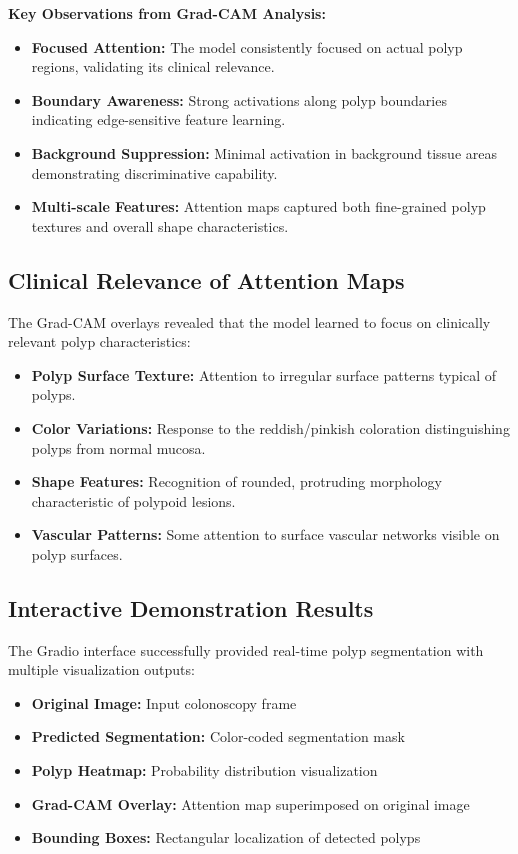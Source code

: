 \documentclass[a4paper,12pt]{report}
\begin{document}
\textbf{Key Observations from Grad-CAM Analysis:}
\begin{itemize}
\item \textbf{Focused Attention:} The model consistently focused on actual polyp regions, validating its clinical relevance.
\item \textbf{Boundary Awareness:} Strong activations along polyp boundaries indicating edge-sensitive feature learning.
\item \textbf{Background Suppression:} Minimal activation in background tissue areas demonstrating discriminative capability.
\item \textbf{Multi-scale Features:} Attention maps captured both fine-grained polyp textures and overall shape characteristics.
\end{itemize}

\subsection{Clinical Relevance of Attention Maps}

The Grad-CAM overlays revealed that the model learned to focus on clinically relevant polyp characteristics:

\begin{itemize}
\item \textbf{Polyp Surface Texture:} Attention to irregular surface patterns typical of polyps.
\item \textbf{Color Variations:} Response to the reddish/pinkish coloration distinguishing polyps from normal mucosa.
\item \textbf{Shape Features:} Recognition of rounded, protruding morphology characteristic of polypoid lesions.
\item \textbf{Vascular Patterns:} Some attention to surface vascular networks visible on polyp surfaces.
\end{itemize}

\subsection{Interactive Demonstration Results}

The Gradio interface successfully provided real-time polyp segmentation with multiple visualization outputs:

\begin{itemize}
\item \textbf{Original Image:} Input colonoscopy frame
\item \textbf{Predicted Segmentation:} Color-coded segmentation mask
\item \textbf{Polyp Heatmap:} Probability distribution visualization
\item \textbf{Grad-CAM Overlay:} Attention map superimposed on original image
\item \textbf{Bounding Boxes:} Rectangular localization of detected polyps
\end{itemize}
\end{document}

